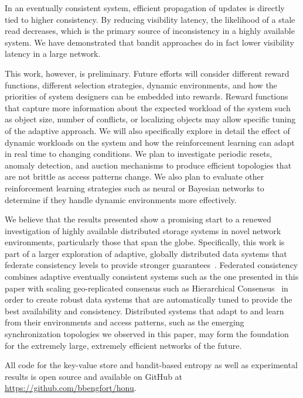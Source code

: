 In an eventually consistent system, efficient propagation of updates is
directly tied to higher consistency.
By reducing visibility latency, the likelihood of a stale read decreases,
which is the primary source of inconsistency in a highly available system.
We have demonstrated that bandit approaches do in fact lower visibility
latency in a large network.

This work, however, is preliminary.
Future efforts will consider different reward functions, different selection
strategies, dynamic environments, and how the priorities of system designers
can be embedded into rewards.
Reward functions that capture more information about the expected workload of
the system such as object size, number of conflicts, or localizing objects
may allow specific tuning of the adaptive approach.
We will also specifically explore in detail the effect of dynamic workloads
on the system and how the reinforcement learning can adapt in real time to
changing conditions.
We plan to investigate periodic resets, anomaly detection, and auction
mechanisms to produce efficient topologies that are not brittle as access
patterns change.
We also plan to evaluate other reinforcement learning strategies such as
neural or Bayesian networks to determine if they handle dynamic environments
more effectively.


We believe that the results presented show a promising start to a renewed
investigation of highly available distributed storage systems in novel
network environments, particularly those that span the globe.
Specifically, this work is part of a larger exploration of adaptive,
globally distributed data systems that federate consistency levels to provide
stronger guarantees~\cite{bengfort_federating_2017}.
Federated consistency combines adaptive eventually consistent systems such as
the one presented in this paper with scaling geo-replicated consensus such as
Hierarchical Consensus~\cite{bengfort_brief_2017} in order to create robust
data systems that are automatically tuned to provide the best availability
and consistency.
Distributed systems that adapt to and learn from their environments and
access patterns, such as the emerging synchronization topologies we observed
in this paper, may form the foundation for the extremely large, extremely
efficient networks of the future.

All code for the key-value store and bandit-based entropy as well as
experimental results is open source and available on GitHub at
\url{https://github.com/bbengfort/honu}.
